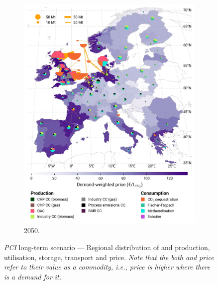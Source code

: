 \documentclass[final,5p,times,twocolumn,sort&compress]{elsarticle}
\begin{document}
\begin{figure}[htbp]
\begin{subfigure}[t]{0.4\textwidth}
      \includegraphics[width=1\textwidth,trim=0cm 0cm 0cm 0cm, clip]{maps/pcipmi/base_s_adm___2050-balance_map_co2_stored} 
      \vspace{-0.7cm}
      \caption{ 2050.}
      \label{fig:PCI_lt_2050_co2}
  \end{subfigure}
  \vspace{0.3cm}
  \caption{\textit{PCI} long-term scenario --- Regional distribution of  and  production, utilisation, storage, transport and price. \textit{Note that the both  and  price refer to their value as a commodity, i.e., price is higher where there is a demand for it.}}
  \label{fig:PCI_lt_2050}
\end{figure}
\clearpage
\end{document}
